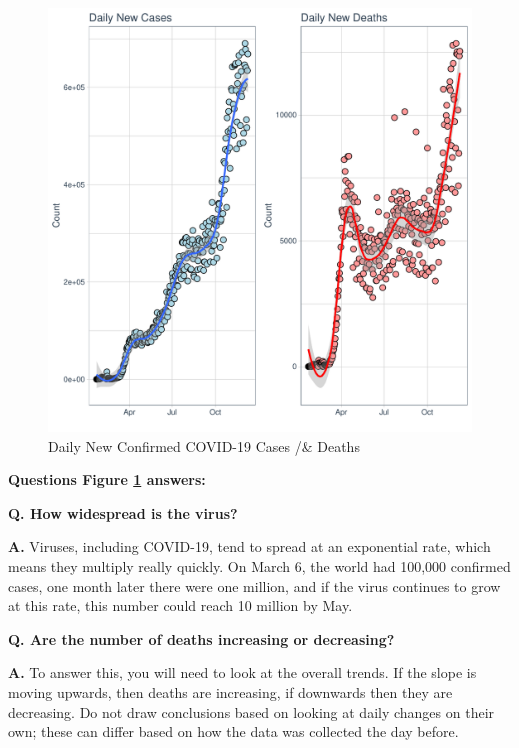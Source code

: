 \begin{figure}[h!]
    \centering
    \includegraphics[width=\linewidth]{images/world_daily_confirmed_deaths_and_cases.pdf}
    \caption{Daily New Confirmed COVID-19 Cases /& Deaths}
    \label{fig:world_confirmed_cases}
\end{figure}

\textbf{Questions Figure \ref{fig:world_confirmed_cases}  answers:}

\textbf{Q. How widespread is the virus?}

\textbf{A.} Viruses, including COVID-19, tend to spread at an exponential rate, which means they multiply really quickly. On March 6, the world had 100,000 confirmed cases, one month later there were one million, and if the virus continues to grow at this rate, this number could reach 10 million by May.

\textbf{Q. Are the number of deaths increasing or decreasing?}

\textbf{A.} To answer this, you will need to look at the overall trends. If the slope is moving upwards, then deaths are increasing, if downwards then they are decreasing. Do not draw conclusions based on looking at daily changes on their own; these can differ based on how the data was collected the day before.

\newpage

